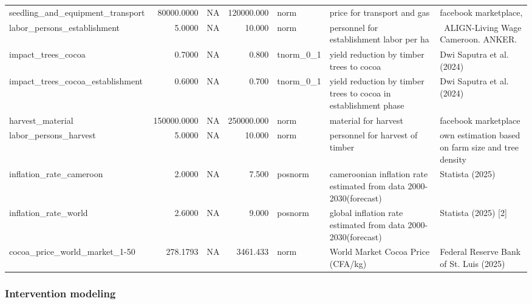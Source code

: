 \documentclass[
]{article}
\begin{document}
\begin{longtable}[t]{lrlrlll}
\addlinespace
seedling\_and\_equipment\_transport & 80000.0000 & NA & 120000.000 & norm & price for transport and gas & facebook marketplace,\\
labor\_persons\_establishment & 5.0000 & NA & 10.000 & norm & personnel for establishment labor per ha &  ALIGN-Living Wage Cameroon. ANKER.\\
impact\_trees\_cocoa & 0.7000 & NA & 0.800 & tnorm\_0\_1 & yield reduction by timber trees to cocoa & Dwi Saputra et al. (2024)\\
impact\_trees\_cocoa\_establishment & 0.6000 & NA & 0.700 & tnorm\_0\_1 & yield reduction by timber trees to cocoa in establishment phase & Dwi Saputra et al. (2024)\\
harvest\_material & 150000.0000 & NA & 250000.000 & norm & material for harvest & facebook marketplace\\
\addlinespace
labor\_persons\_harvest & 5.0000 & NA & 10.000 & norm & personnel for harvest of timber & own estimation based on farm size and tree density\\
inflation\_rate\_cameroon & 2.0000 & NA & 7.500 & posnorm & cameroonian inflation rate estimated from data 2000-2030(forecast) & Statista (2025)\\
inflation\_rate\_world & 2.6000 & NA & 9.000 & posnorm & global inflation rate estimated from data 2000-2030(forecast) & Statista (2025) [2]\\
cocoa\_price\_world\_market\_1-50 & 278.1793 & NA & 3461.433 & norm & World Market Cocoa Price (CFA/kg) & Federal Reserve Bank of St. Luis (2025)\\
\bottomrule
\end{longtable}
\newpage

\hypertarget{intervention-modeling}{%
\subsubsection{Intervention modeling}\label{intervention-modeling}}
\end{document}
